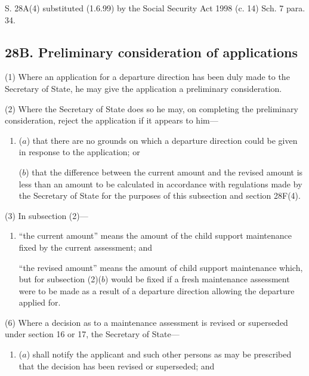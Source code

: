 \documentclass[12pt,a4paper]{article}
\begin{document}
{{S. 28A(4) substituted (1.6.99) by the Social Security Act 1998 (c. 14) Sch. 7 para. 34.


}

\subsection{28B. Preliminary consideration of applications}

(1) Where an application for a departure direction has been duly made to the Secretary of State, he may give the application a preliminary consideration.

(2) Where the Secretary of State does so he may, on completing the preliminary consideration, reject the application if it appears to him---
\begin{enumerate}\item[]
($a$) that there are no grounds on which a departure direction could be given in response to the application; or

($b$) that the difference between the current amount and the revised amount is less than an amount to be calculated in accordance with regulations made by the Secretary of State for the purposes of this subsection and section 28F(4).
\end{enumerate}

(3) In subsection (2)---
\begin{enumerate}\item[]
 “the current amount” means the amount of the child support maintenance fixed by the current assessment; and 

“the revised amount” means the amount of child support maintenance which, but for subsection (2)($b$) would be fixed if a fresh maintenance assessment were to be made as a result of a departure direction allowing the departure applied for.
\end{enumerate}

(6) Where a decision as to a maintenance assessment is revised or superseded under section 16 or 17, the Secretary of State---
\begin{enumerate}\item[]
($a$) shall notify the applicant and such other persons as may be prescribed that the decision has been revised or superseded; and


\end{enumerate}}
\end{document}
